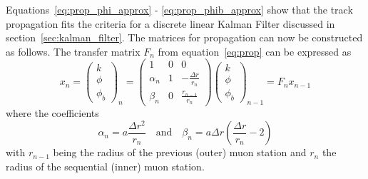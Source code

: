 Equations~\ref{eq:prop_phi_approx} - \ref{eq:prop_phib_approx} show that the track propagation fits the criteria for a discrete linear Kalman Filter discussed in section~\ref{sec:kalman_filter}. The matrices for propagation can now be constructed as follows. The transfer matrix $F_n$ from equation~\ref{eq:prop} can be expressed as
\begin{equation}
	\label{eq:kmtfProp}
	x_{n}=\left(\begin{matrix}
		k\\
		\phi\\
		\phi_b
	\end{matrix}\right)_{n} = 
\left(\begin{matrix}
	1 & 0 & 0\\
	\alpha_n & 1 & -\frac{\Delta r}{r_n}\\
	\beta_n & 0 & \frac{r_{n-1}}{r_n}
\end{matrix}\right)
\left(\begin{matrix}
	k\\
	\phi\\
	\phi_b
\end{matrix}\right)_{n-1}=F_nx_{n-1}
\end{equation}
where the coefficients
\begin{equation}
	\label{eq:kmtf_coeff}
	\alpha_n=a\frac{\Delta r^2}{r_n} \quad \mathrm{and} \quad \beta_n=a\Delta r\left(\frac{\Delta r}{r_n}-2\right)
\end{equation}
with $r_{n-1}$ being the radius of the previous (outer) muon station and $r_n$ the radius of the sequential (inner) muon station.

